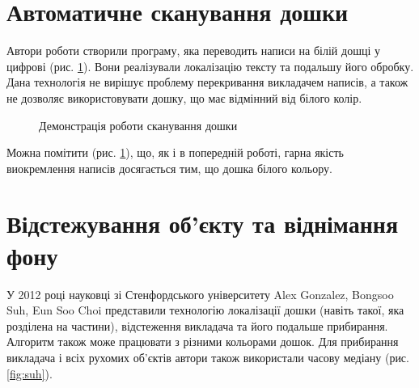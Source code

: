 \section{Автоматичне сканування дошки}
Автори роботи \cite{bib:wienecke} створили програму, яка переводить написи на білій
дошці у цифрові (рис. \ref{fig:wienecke}). Вони реалізували локалізацію тексту та подальшу
його обробку. Дана технологія не вирішує проблему перекривання викладачем написів,
а також не дозволяє використовувати дошку, що має відмінний від білого колір.
\begin{figure}[H]
  \centering
  \caption{Демонстрація роботи сканування дошки \cite{bib:wienecke}
    \label{fig:wienecke}
  }
\end{figure}
Можна помітити (рис. \ref{fig:wienecke}), що, як і в попередній роботі, гарна якість виокремлення написів
досягається тим, що дошка білого кольору.

\section{Відстежування об'єкту та віднімання фону}
У 2012 році науковці зі Стенфордського університету Alex Gonzalez,
Bongsoo Suh, Eun Soo Choi представили технологію \cite{bib:suh} локалізації дошки
(навіть такої, яка розділена на частини), відстеження викладача та його
подальше прибирання. Алгоритм також може працювати з різними кольорами
дошок. Для прибирання викладача і всіх рухомих об'єктів автори також
використали часову медіану (рис. \ref{fig:suh}).

